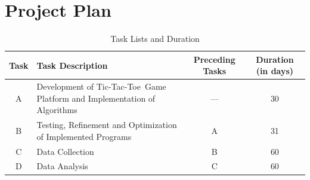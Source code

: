 \documentclass{strrespaper-trad}
\newcommand{\ttt}{Tic-Tac-Toe}
\begin{document}
	\chapter{Project Plan}
		\begin{table}[htbp]
			\centering
			\caption{Task Lists and Duration}
			\label{tab:task_lists_duration}
			\begin{tabularx}{\linewidth}{cXcc}
				\toprule
				Task & Task Description                                                    & Preceding Tasks & Duration (in days) \\
				\midrule
				A    & Development of \ttt\ Game Platform and Implementation of Algorithms & ---             & 30                 \\
				B    & Testing, Refinement and Optimization of Implemented Programs        & A               & 31                 \\
				C    & Data Collection                                                     & B               & 60                 \\
				D    & Data Analysis                                                       & C               & 60                 \\
				\bottomrule
			\end{tabularx}
		\end{table}
\end{document}

